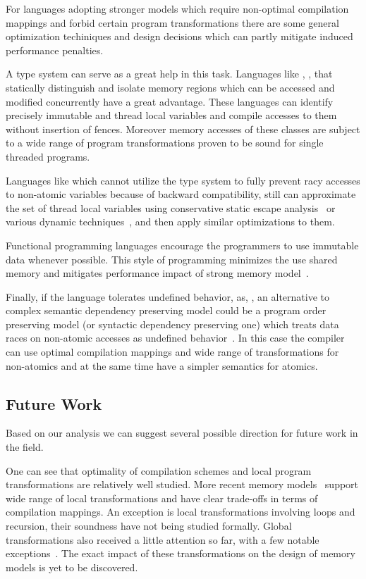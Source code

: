For languages adopting stronger models which require non-optimal
compilation mappings and forbid certain program transformations
there are some general optimization techiniques and design decisions
which can partly mitigate induced performance penalties.

A type system can serve as a great help in this task. 
Languages like \Haskell, \OCaml, \Rust that 
statically distinguish and isolate memory regions 
which can be accessed and modified concurrently have a great advantage.
These languages can identify precisely 
immutable and thread local variables
and compile accesses to them without insertion of fences.
Moreover memory accesses of these classes are subject to 
a wide range of program transformations proven to be
sound for single threaded programs. 
 
Languages like \Java which cannot utilize the type system 
to fully prevent racy accesses to non-atomic variables 
because of backward compatibility, still can 
approximate the set of thread local variables    
using conservative static escape analysis~\cite{Choi-al:OOPSLA1999}
or various dynamic techniques~\cite{Liu-al:PLDI19},
and then apply similar optimizations to them. 

Functional programming languages encourage 
the programmers to use immutable data whenever possible.
This style of programming minimizes the use 
shared memory and mitigates performance impact 
of strong memory model~\cite{Vollmer-al:PPoPP17}. 

Finally, if the language tolerates undefined behavior, as, \CPP, 
an alternative to complex semantic dependency preserving model
could be a program order preserving model (or syntactic dependency preserving one) 
which treats data races on non-atomic accesses as 
undefined behavior~\cite{Boehm-Demsky:MSPC14, Ou-Demsky:OOPSLA18}.
In this case the compiler can use optimal compilation mappings 
and wide range of transformations for non-atomics 
and at the same time have a simpler semantics for atomics. 

\subsection{Future Work}

Based on our analysis we can suggest several
possible direction for future work in the field. 

One can see that optimality of compilation schemes 
and local program transformations are relatively well studied.
More recent memory models~%
\cite{Lahav-al:PLDI17, Dolan-al:PLDI18, Kang-al:POPL17, Chakraborty-Vafeiadis:POPL19} 
support wide range of local transformations and have clear 
trade-offs in terms of compilation mappings. 
An exception is local transformations involving loops and recursion, 
their soundness have not being studied formally. 
Global transformations also received a little attention so far,
with a few notable exceptions~\cite{PichonPharabod-Sewell:POPL16, Lee-al:PLDI20}.
The exact impact of these transformations on the design of 
memory models is yet to be discovered. 


